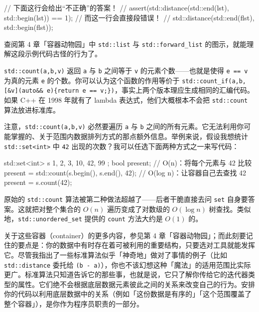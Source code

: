 \begin{codebox}[cpp]
    // 下面这行会给出“不正确”的答案！
    // assert(std::distance(std::end(lst), std::begin(lst)) == 1);
    // 而这一行会直接段错误！
    // std::distance(std::end(flst), std::begin(flst));
\end{codebox}

查阅第 4 章「容器动物园」中 \texttt{std::\allowbreak{}list} 与 \texttt{std::\allowbreak{}forward\_\allowbreak{}list} 的图示，就能理解这段示例代码古怪的行为了。

\texttt{std::\allowbreak{}count(\allowbreak{}a,\allowbreak{}b,\allowbreak{}v)\allowbreak{}} 返回 \texttt{a} 与 \texttt{b} 之间等于 \texttt{v} 的元素个数——也就是使得 \texttt{e == v} 为真的元素 \texttt{e} 的个数。你可以认为这个函数的作用等价于 \texttt{std::\allowbreak{}count\_\allowbreak{}if(\allowbreak{}a,\allowbreak{}b,\allowbreak{}[\&v](\allowbreak{}auto\&\& e)\allowbreak{}\{return e == v;\})}，事实上两个版本理应生成相同的汇编代码。如果 C++ 在 1998 年就有了 lambda 表达式，他们大概根本不会把 \texttt{std::\allowbreak{}count} 算法放进标准库。

注意，\texttt{std::\allowbreak{}count(\allowbreak{}a,\allowbreak{}b,\allowbreak{}v)\allowbreak{}} 必然要遍历 \texttt{a} 与 \texttt{b} 之间的所有元素。它无法利用你可能掌握的、关于范围内数据排列方式的那点额外信息。举例来说，假设我想统计 \texttt{std::\allowbreak{}set<\allowbreak{}int>\allowbreak{}} 中 \texttt{42} 出现的次数？我可以任选下面两种方式之一来写代码：

\begin{codebox}[cpp]
    std::set<int> s { 1, 2, 3, 10, 42, 99 };
    bool present;
    // O(n)：将每个元素与 42 比较
    present = std::count(s.begin(), s.end(), 42);
    // O(log n)：让容器自己去查找 42
    present = s.count(42);
\end{codebox}

原始的 \texttt{std::\allowbreak{}count} 算法被第二种做法超越了——后者干脆直接去问 \texttt{set} 自身要答案。这就把对整个集合的 $O(n)$ 遍历变成了对数级的 $O(\log n)$ 树查找。类似地，\texttt{std::\allowbreak{}unordered\_\allowbreak{}set} 提供的 \texttt{count} 方法大约是 $O(1)$ 的。

关于这些容器（container）的更多内容，参见第 4 章「容器动物园」；而此刻要记住的要点是：你的数据中有时存在着可被利用的重要结构，只要选对工具就能发挥它。尽管我指出了一些标准算法似乎「神奇地」做对了事情的例子（比如 \texttt{std::\allowbreak{}distance} 委托给 \texttt{(\allowbreak{}b - a)\allowbreak{}}），你也不该幻想这种「魔法」的适用范围比实际更广。标准算法只知道告诉它的那些事，也就是说，它只了解你传给它的迭代器类型的属性。它们绝不会根据底层数据元素彼此之间的关系来改变自己的行为。安排你的代码以利用底层数据中的关系（例如「这份数据是有序的」「这个范围覆盖了整个容器」），是你作为程序员职责的一部分。

